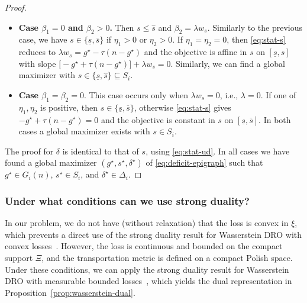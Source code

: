 \documentclass[11pt]{article}
\newcommand{\XiSet}{\Xi}
\theoremstyle{plain}
\theoremstyle{definition}
\begin{document}
\begin{proof}
\begin{itemize}
    \item \textbf{Case $\beta_1=0$ and $\beta_2>0$.} Then $s\le\widehat s$ and $\beta_2=\lambda w_s$. 
    Similarly to the previous case, we have $s\in\{\underline s,\overline s\}$ if $\eta_1>0$ or $\eta_2>0$.
    If $\eta_1=\eta_2=0$, then \eqref{eq:stat-s} reduces to $\lambda w_s=g^\star-\tau(n-g^\star)$ and the objective is affine in $s$ on $[\underline s,\widehat s]$ with slope $\bigl[-g^\star+\tau(n-g^\star)\bigr]+\lambda w_s=0$.
    Similarly, we can find a global maximizer with $s\in\{\underline s,\widehat s\}\subseteq S_i$.
 
    \item \textbf{Case $\beta_1=\beta_2=0$}.
    This case occurs only when $\lambda w_s=0$, i.e., $\lambda=0$.
    If one of $\eta_1,\eta_2$ is positive, then $s\in\{\underline s,\overline s\}$, otherwise \eqref{eq:stat-s} gives $-g^\star+\tau(n-g^\star)=0$ and the objective is constant in $s$ on $[\underline s,\overline s]$.
    In both cases a global maximizer exists with $s\in S_i$.
\end{itemize}

\noindent The proof for $\delta$ is identical to that of $s$, using \eqref{eq:stat-ud}.
In all cases we have found a global maximizer $(g^\star,s^\star,\delta^\star)$ of \eqref{eq:deficit-epigraph} such that $g^\star\in G_i(n)$, $s^\star\in S_i$, and $\delta^\star\in\Delta_i$.
\end{proof}

\subsubsection{Under what conditions can we use strong duality?}
In our problem, we do not have (without relaxation) that the loss is convex in $\xi$, which prevents a direct use of the strong duality result for Wasserstein DRO with convex losses~\cite{EsfahaniKuhn2018}.
However, the loss is continuous and bounded on the compact support $\XiSet$, and the transportation metric is defined on a compact Polish space. 
Under these conditions, we can apply the strong duality result for Wasserstein DRO with measurable bounded losses~\cite{GaoKleywegt2022, ZhangYangGao2025}, which yields the dual representation in Proposition~\ref{prop:wasserstein-dual}.
\end{document}
